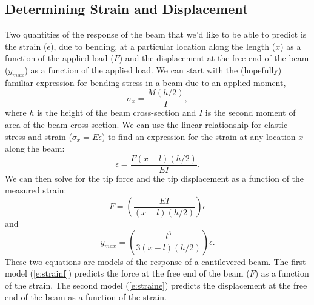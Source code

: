 \subsection{Determining Strain and Displacement}
Two quantities of the response of the beam that we'd like to be able to predict is the strain ($\epsilon$), due to bending, at a particular location along the length ($x$) as a function of the applied load ($F$) and the displacement at the free end of the beam ($y_{max}$) as a function of the applied load.  We can start with the (hopefully) familiar expression for bending stress in a beam due to an applied moment,
\[
\sigma_x=\frac{M(h/2)}{I},
\]
where $h$ is the height of the beam cross-section and $I$ is the second moment of area of the beam cross-section.  We can use the linear relationship for elastic stress and strain ($\sigma_x = E \epsilon$) to find an expression for the strain at any location $x$ along the beam:
\begin{equation}\label{e:eps}
\epsilon = \frac{F(x-l)(h/2)}{EI}.
\end{equation}
We can then solve for the tip force and the tip displacement as a function of the measured strain:
\begin{equation}\label{e:strainf}
F = \left( \frac{EI}{(x-l)(h/2)} \right) \epsilon 
\end{equation}
and
\begin{equation}\label{e:straine}
y_{max}=\left( \frac{l^3}{3(x-l)(h/2)} \right) \epsilon.
\end{equation}
These two equations are models of the response of a cantilevered beam. The first model (\ref{e:strainf}) predicts the force at the free end of the beam ($F$) as a function of the strain.  The second model (\ref{e:straine}) predicts the displacement at the free end of the beam as a function of the strain.

